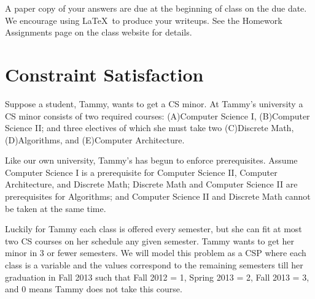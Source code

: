 \documentclass[12pt]{article}
\begin{document}

A paper copy of your answers are due at the beginning of class on the due date. We encourage using \LaTeX\ to produce your writeups. See the Homework Assignments page on the class website for details.

\section{Constraint Satisfaction}

Suppose a student, Tammy, wants to get a CS minor.  At Tammy's
university a CS minor consists of two required courses: (A)Computer
Science I, (B)Computer Science II; and three electives of which she
must take two (C)Discrete Math, (D)Algorithms, and (E)Computer
Architecture.

Like our own university, Tammy's has begun to enforce prerequisites.
Assume Computer Science I is a prerequisite for Computer Science II,
Computer Architecture, and Discrete Math; Discrete Math and Computer Science II are
prerequisites for Algorithms; and Computer Science II and Discrete Math
cannot be taken at the same time.

Luckily for Tammy each class is offered every semester, but she can
fit at most two CS courses on her schedule any given semester.  Tammy
wants to get her minor in 3 or fewer semesters.  We will model this
problem as a CSP where each class is a variable and the values
correspond to the remaining semesters till her graduation in Fall 2013
such that Fall 2012 = 1, Spring 2013 = 2, Fall 2013 = 3, and 0 means
Tammy does not take this course.
\end{document}
